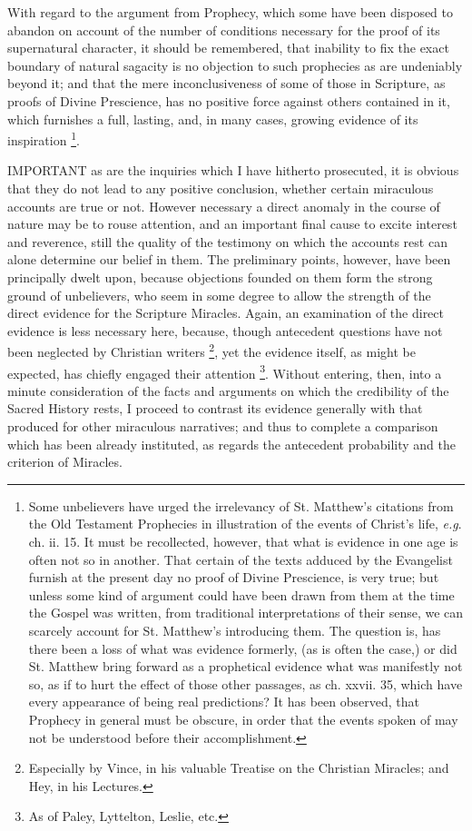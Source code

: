 With regard to the argument from Prophecy, which
some have been disposed to abandon on account of the number of
conditions necessary for the proof of its supernatural character, it
should be remembered, that inability to fix the exact boundary of
natural sagacity is no objection to such prophecies as are undeniably
beyond it; and that the mere inconclusiveness of some of those in
Scripture, as proofs of Divine Prescience, has no positive force
against others contained in it, which furnishes a full, lasting, and,
in many cases, growing evidence of its inspiration \footnote{Some unbelievers have urged the irrelevancy of St. Matthew's citations
from the Old Testament Prophecies in illustration of the events of
Christ's life, \emph{e.g}. ch. ii. 15. It must be recollected,
however, that what is evidence in one age is often not so in another.
That certain of the texts adduced by the Evangelist furnish at the
present day no proof of Divine Prescience, is very true; but unless
some kind of argument could have been drawn from them at the time the
Gospel was written, from traditional interpretations of their sense,
we can scarcely account for St. Matthew's introducing them. The
question is, has there been a loss of what was evidence formerly, (as
is often the case,) or did St. Matthew bring forward as a prophetical
evidence what was manifestly not so, as if to hurt the effect of those
other passages, as ch. xxvii. 35, which have every appearance of being
real predictions? It has been observed, that Prophecy in general must
be obscure, in order that the events spoken of may not be understood
before their accomplishment.}.


IMPORTANT
as are the inquiries which I have hitherto prosecuted, it is obvious
that they do not lead to any positive conclusion, whether certain
miraculous accounts are true or not. However necessary a direct
anomaly in the course of nature may be to rouse attention, and an
important final cause to excite interest and reverence, still the
quality of the testimony on which the accounts rest can alone
determine our belief in them. The preliminary points, however, have
been principally dwelt upon, because objections founded on them form
the strong ground of unbelievers, who seem in some degree to allow the
strength of the direct evidence for the Scripture Miracles. Again, an
examination of the direct evidence is less necessary here, because,
though antecedent questions have not been neglected by Christian
writers \footnote{Especially by Vince, in his valuable Treatise
on the Christian Miracles; and Hey, in his Lectures.}, yet the evidence
itself, as might be expected, has chiefly engaged their attention
\footnote{As of Paley, Lyttelton, Leslie, etc.}. Without entering, then,
into a minute consideration of the facts and arguments on which the
credibility of the Sacred History rests, I proceed to contrast its
evidence generally with that produced for other miraculous narratives;
and thus to complete a comparison which has been already instituted,
as regards the antecedent probability and the criterion of Miracles.


